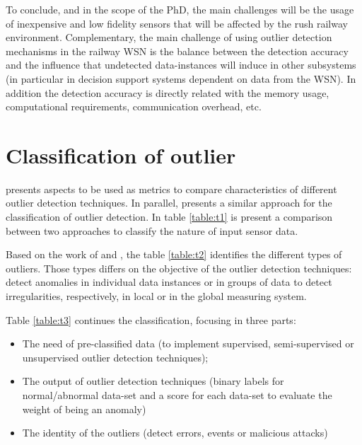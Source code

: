 To conclude, and in the scope of the PhD, the main challenges will be the usage of inexpensive and low fidelity sensors that will be affected by the rush railway environment. Complementary, the main challenge of using outlier detection mechanisms in the railway WSN is the balance between the detection accuracy and the influence that undetected data-instances will induce in other subsystems (in particular in decision support systems dependent on data from the WSN). In addition the detection accuracy is directly related with the memory usage, computational requirements, communication overhead, etc. 


\newpage

\section{Classification of outlier}

\cite{gen:zhang:2010} presents aspects to be used as metrics to compare characteristics of different outlier detection techniques. In parallel, \cite{gen:chandola:2009} presents a similar approach for the classification of outlier detection. 
In table \ref{table:t1} is present a comparison between two approaches to classify the nature of input sensor data.

	

	

Based on the work of \cite{gen:zhang:2010} and \cite{gen:chandola:2009}, the table \ref{table:t2} identifies the different types of outliers. 
Those types differs on the objective of the outlier detection techniques: detect anomalies in individual data instances or in groups of data to detect irregularities, respectively, in local or in the global measuring system.



\newpage


Table \ref{table:t3} continues the classification, focusing in three parts: 
\begin{itemize}
		\setlength\itemsep{-0.5em}
		\item The need of pre-classified data (to implement supervised, semi-supervised or unsupervised outlier detection techniques);
		
		\item The output of outlier detection techniques (binary labels for normal/abnormal data-set and a score for each data-set to evaluate the weight of being an anomaly)
		
		\item The identity of the outliers (detect errors, events or malicious attacks)
\end{itemize}

